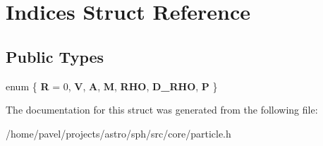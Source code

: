\hypertarget{structIndices}{}\section{Indices Struct Reference}
\label{structIndices}
\subsection*{Public Types}
\begin{DoxyCompactItemize}
\item 
\hypertarget{structIndices_ab141109dba6be6dc64b8a022353864b8}{}\label{structIndices_ab141109dba6be6dc64b8a022353864b8} 
enum \{ \newline
{\bfseries R} = 0, 
{\bfseries V}, 
{\bfseries A}, 
{\bfseries M}, 
\newline
{\bfseries R\+HO}, 
{\bfseries D\+\_\+\+R\+HO}, 
{\bfseries P}
 \}
\end{DoxyCompactItemize}


The documentation for this struct was generated from the following file\+:\begin{DoxyCompactItemize}
\item 
/home/pavel/projects/astro/sph/src/core/particle.\+h\end{DoxyCompactItemize}
